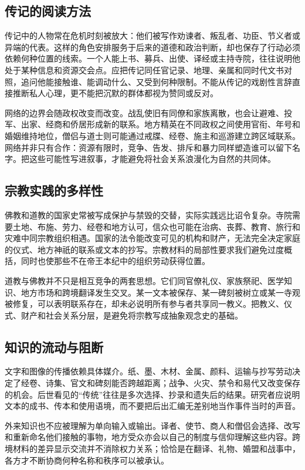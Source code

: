 \subsection{传记的阅读方法}
传记中的人物常在危机时刻被放大：他们被写作劝谏者、叛乱者、功臣、节义者或异端的代表。这样的角色安排服务于后来的道德和政治判断，却也保存了行动必须依赖何种位置的线索。一个人能上书、募兵、出使、译经或主持寺院，往往说明他处于某种信息和资源交会点。应把传记同任官记录、地理、亲属和同时代文书对照，追问他能接触谁、能调动什么、又受到何种限制。不能从传记的戏剧性言辞直接推断私人心理，更不能把沉默的群体都视为赞同或反对。

网络的边界会随政权改变而改变。战乱使旧有同僚和家族离散，也会让避难、投军、出家、经商和侨居形成新的联系。地方精英在不同政权之间使用官衔、年号和婚姻维持地位，僧侣与道士则可能通过戒牒、经卷、施主和巡游建立跨区域联系。网络并非只有合作：资源有限时，竞争、告发、排斥和暴力同样塑造谁可以留下名字。把这些可能性写进叙事，才能避免将社会关系浪漫化为自然的共同体。

\subsection{宗教实践的多样性}
佛教和道教的国家史常被写成保护与禁毁的交替，实际实践远比诏令复杂。寺院需要土地、布施、劳力、经卷和地方认可，信众也可能在治病、丧葬、教育、旅行和灾难中同宗教组织相遇。国家的法令能改变可见的机构和财产，无法完全决定家庭的仪式、地方神祇的联系或文本的抄写。宗教材料的局部性要求我们避免过度概括，同时也使那些不在帝王本纪中的组织劳动获得位置。

道教与佛教并不只是相互竞争的两套思想。它们同官僚礼仪、家族祭祀、医学知识、地方市场和跨境翻译发生交叉。某一文本被保存、某一碑刻被树立或某一寺观被修复，可以表明联系存在，却未必说明所有参与者共享同一教义。把教义、仪式、财产和社会关系分层，是避免将宗教写成抽象观念史的基础。

\subsection{知识的流动与阻断}
文字和图像的传播依赖具体媒介。纸、墨、木材、金属、颜料、运输与抄写劳动决定了经卷、诗集、官文和碑刻能否跨越距离；战争、火灾、禁令和易代又改变保存的机会。后世看见的“传统”往往是多次选择、抄录和遗失后的结果。研究者应说明文本的成书、传本和使用语境，而不要把后出汇编无差别地当作事件当时的声音。

外来知识也不应被理解为单向输入或输出。译者、使节、商人和僧侣会选择、改写和重新命名他们接触的事物，地方受众亦会以自己的制度与信仰理解这些内容。跨境材料的差异显示交流并不消除权力关系；恰恰是在翻译、礼物、婚盟和战事中，各方才不断协商何种名称和秩序可以被承认。

